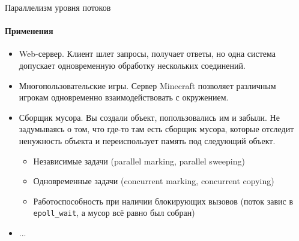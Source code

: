 \begin{frame}{Параллелизм уровня потоков}
\framesubtitle{Применения}

\begin{itemize}
 \pause 
 \item Web-сервер. Клиент шлет запросы, получает ответы, но одна система допускает одновременную обработку нескольких соединений.

 \pause
 \item Многопользовательские игры. Сервер Minecraft позволяет различным игрокам одновременно взаимодействовать с окружением.


 \pause 
 \item Сборщик мусора. Вы создали объект, попользовались им и забыли. Не задумываясь о том, что где-то там есть сборщик мусора, которые отследит ненужность объекта и переиспользует память под следующий объект.
 
  \begin{itemize}
    \pause
    \item Независимые задачи (parallel marking, parallel sweeping)
    
    \pause
    \item Одновременные задачи (concurrent marking, concurrent copying)
    
    \pause
    \item Работоспособность при наличии блокирующих вызовов (поток завис в \texttt{epoll\_wait}, а мусор всё равно был собран)
  \end{itemize}

\pause
 
 \item ...

\end{itemize}
 
\end{frame}


